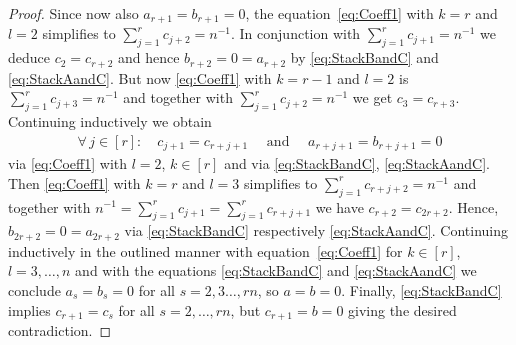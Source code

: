 \documentclass[10pt,a4paper]{article}
\numberwithin{equation}{section}
\begin{document}
\begin{proof}
Since now also $a_{r + 1} = b_{r +1} = 0$, the equation~\eqref{eq:Coeff1} with $k=r$ and $l=2$ simplifies to $\sum_{j=1}^r c_{j+2} = n^{-1}$. In conjunction with $\sum_{j=1}^{r} c_{j+1} = n^{-1}$ we deduce $c_2 = c_{r+2}$ and hence $b_{r+2} = 0 = a_{r +2} $ by \eqref{eq:StackBandC} and \eqref{eq:StackAandC}. But now \eqref{eq:Coeff1} with $k=r-1$ and $l=2$ is $\sum_{j=1}^r c_{j+3} = n^{-1}$ and together with $\sum_{j=1}^r c_{j+2} = n^{-1}$ we get $c_3 = c_{r+3}$. Continuing inductively we obtain 
	\begin{align*}
	\forall \, j \in [r] \colon \quad c_{j+1} = c_{r + j + 1} \quad \text{ and } \quad a_{r + j +1} = b_{r + j + 1} = 0
	\end{align*}
via \eqref{eq:Coeff1} with $l=2$, $k \in [r]$ and via \eqref{eq:StackBandC}, \eqref{eq:StackAandC}. Then \eqref{eq:Coeff1} with $k=r$ and $l=3$ simplifies to $\sum_{j=1}^r c_{r + j+2} = n^{-1}$ and together with $n^{-1} = \sum_{j=1}^{r} c_{j+1} =  \sum_{j=1}^{r} c_{r + j +1}$ we have $c_{r + 2} = c_{2r + 2}$. Hence, $b_{2 r+2} = 0 = a_{2 r + 2}$ via \eqref{eq:StackBandC} respectively \eqref{eq:StackAandC}. Continuing inductively in the outlined manner with equation~\eqref{eq:Coeff1} for $k \in [r]$, $l=3,\ldots,n$ and with the equations \eqref{eq:StackBandC} and \eqref{eq:StackAandC} we conclude $a_s = b_s = 0$ for all $s=2,3 \ldots, r n$, so $a=b=0$. Finally, \eqref{eq:StackBandC} implies $c_{r + 1} = c_s$ for all $s = 2,\ldots, r n$, but $c_{r + 1} = b = 0$ giving the desired contradiction.
\end{proof}
\end{document}
